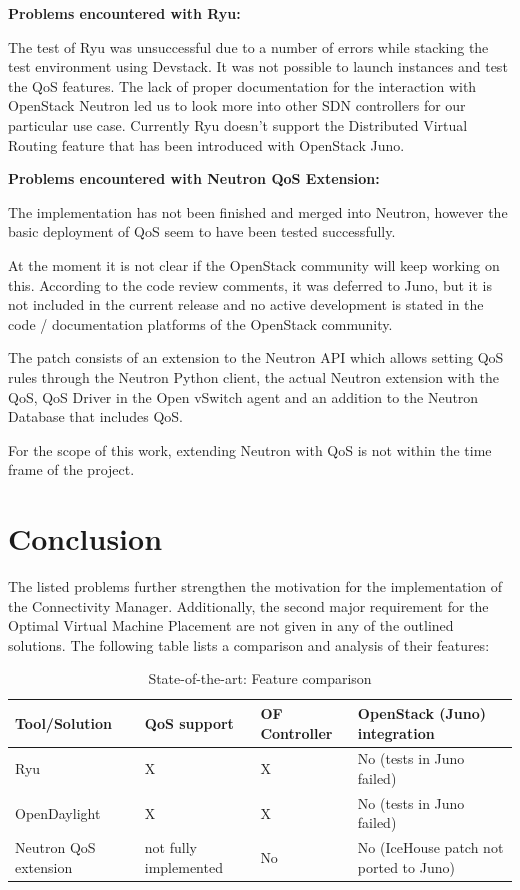 \textbf{Problems encountered with Ryu:}

The test of Ryu was unsuccessful due to a number of errors while stacking the test environment using Devstack. It was not possible to launch instances and test the QoS features. The lack of proper documentation for the interaction with OpenStack Neutron led us to look more into other SDN controllers for our particular use case. Currently Ryu doesn't support the Distributed Virtual Routing feature that has been introduced with OpenStack Juno.


\textbf{Problems encountered with Neutron QoS Extension:}

The implementation has not been finished and merged into Neutron, however the basic deployment of QoS seem to have been tested successfully. 

At the moment it is not clear if the OpenStack community will keep working on this. According to the code review comments, it was deferred to Juno, but it is not included in the current release and no active development is stated in the code / documentation platforms of the OpenStack community.

The patch consists of an extension to the Neutron API which allows setting QoS rules through the Neutron Python client, the actual Neutron extension with the QoS, QoS Driver in the Open vSwitch agent and an addition to the Neutron Database that includes QoS.

For the scope of this work, extending Neutron with QoS is not within the time frame of the project.

\newpage

\section{Conclusion}

The listed problems further strengthen the motivation for the implementation of the Connectivity Manager. Additionally, the second major requirement for the Optimal Virtual Machine Placement are not given in any of the outlined solutions. The following table lists a comparison and analysis of their features:




\begin{table}[H]
\centering

\begin{tabularx}{\textwidth}{ |X|X|X|X| }
\hline Tool/Solution & QoS support & OF Controller & OpenStack (Juno) integration \\ 
\hline Ryu & X & X & No (tests in Juno failed) \\ 
\hline OpenDaylight & X & X & No (tests in Juno failed) \\ 
\hline Neutron QoS extension & not fully implemented & No & No (IceHouse patch not ported to Juno) \\ 
\hline 
\end{tabularx}

\caption{State-of-the-art: Feature comparison}
\end{table}
